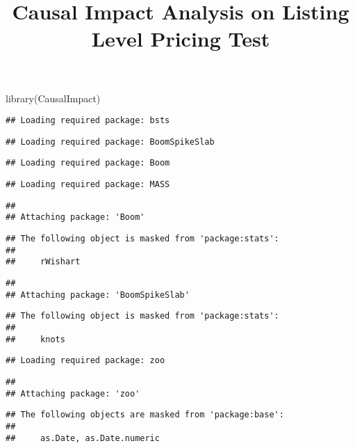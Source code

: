 \documentclass[
]{article}
\title{Causal Impact Analysis on Listing Level Pricing Test}
\author{}
\date{\vspace{-2.5em}}
\newenvironment{Shaded}{\begin{snugshade}}{\end{snugshade}}
\newcommand{\FunctionTok}[1]{\textcolor[rgb]{0.00,0.00,0.00}{#1}}
\newcommand{\NormalTok}[1]{#1}
\begin{document}
\maketitle

\begin{Shaded}
\begin{Highlighting}[]
\FunctionTok{library}\NormalTok{(CausalImpact)}
\end{Highlighting}
\end{Shaded}

\begin{verbatim}
## Loading required package: bsts
\end{verbatim}

\begin{verbatim}
## Loading required package: BoomSpikeSlab
\end{verbatim}

\begin{verbatim}
## Loading required package: Boom
\end{verbatim}

\begin{verbatim}
## Loading required package: MASS
\end{verbatim}

\begin{verbatim}
## 
## Attaching package: 'Boom'
\end{verbatim}

\begin{verbatim}
## The following object is masked from 'package:stats':
## 
##     rWishart
\end{verbatim}

\begin{verbatim}
## 
## Attaching package: 'BoomSpikeSlab'
\end{verbatim}

\begin{verbatim}
## The following object is masked from 'package:stats':
## 
##     knots
\end{verbatim}

\begin{verbatim}
## Loading required package: zoo
\end{verbatim}

\begin{verbatim}
## 
## Attaching package: 'zoo'
\end{verbatim}

\begin{verbatim}
## The following objects are masked from 'package:base':
## 
##     as.Date, as.Date.numeric
\end{verbatim}
\end{document}

